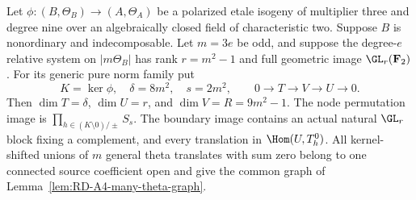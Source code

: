 \begin{proposition}
\label{prop:RD-A4-three-step-boundary}
Let $\phi:(B,\Theta_B)\to(A,\Theta_A)$ be a polarized etale isogeny
of multiplier three and degree nine over an algebraically closed
field of characteristic two.  Suppose $B$ is nonordinary and
indecomposable.  Let $m=3e$ be odd, and suppose the degree-$e$
relative system on $|m\Theta_B|$ has rank $r=m^2-1$ and full
geometric image $\GL_r(\mathbf F_2)$.
For its generic pure norm family put
\[
 K=\ker\phi,\quad \delta=8m^2,\quad s=2m^2,
 \qquad 0\to T\to V\to U\to0.
\]
Then $\dim T=\delta$, $\dim U=r$, and $\dim V=R=9m^2-1$.
The node permutation image is $\prod_{h\in(K\setminus0)/\pm}S_s$.
The boundary image contains an actual natural $\GL_r$ block fixing
a complement, and every translation in $\Hom(U,T_h^0)$.
All kernel-shifted unions of $m$ general theta translates with
sum zero belong to one connected source coefficient open and
give the common graph of Lemma~\ref{lem:RD-A4-many-theta-graph}.
\end{proposition}
